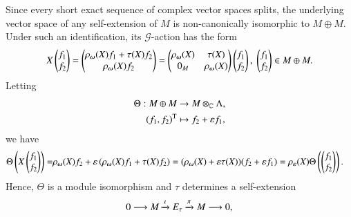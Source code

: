 \documentclass[12pt,reqno]{amsart}
\def\C{\mathbb{C}}
\numberwithin{equation}{section}
\begin{document}
Since every short
exact sequence of complex vector spaces splits, 
the underlying vector space of any self-extension of $M$ is non-canonically isomorphic to $M\oplus M$. Under such an identification, its $\mathcal G$-action has the form
\begin{equation}\label{formula 4.3}
\aligned
X
\begin{pmatrix}
    f_1\\
    f_2
\end{pmatrix}
=\begin{pmatrix}
    \rho_{\boldsymbol{\omega}}(X)f_1+\tau(X)f_2\\
    \rho_{\boldsymbol{\omega}}(X)f_2 
\end{pmatrix}
=\begin{pmatrix}
    \rho_{\boldsymbol{\omega}}(X) & \tau(X) \\
    0_M & \rho_{\boldsymbol{\omega}}(X)
\end{pmatrix}\begin{pmatrix}
    f_1\\
    f_2
\end{pmatrix}, \ 
\begin{pmatrix}
    f_1\\
    f_2
\end{pmatrix}\in M\oplus M.
\endaligned
\end{equation} 
Letting 
\begin{equation*}
\aligned
\Theta: M\oplus M&\to  M\otimes_{\C} \Lambda,\\
(f_1,f_2)^{\operatorname{T}}&\mapsto f_2+\varepsilon f_1,
\endaligned
\end{equation*}
we have
\begin{equation*}
\aligned
\Theta\left( X
\begin{pmatrix}
    f_1\\
    f_2
\end{pmatrix}  \right)=&\rho_{\boldsymbol{\omega}}(X)f_2 +\varepsilon\left(\rho_{\boldsymbol{\omega}}(X)f_1+\tau(X)f_2 \right)
=(\rho_{\boldsymbol{\omega}}(X)+\varepsilon\tau(X))(f_2+\varepsilon f_1)=\rho_{\boldsymbol{\varepsilon}}(X)\Theta\left( 
\begin{pmatrix}
    f_1\\
    f_2
\end{pmatrix}  \right).
\endaligned
\end{equation*}
 Hence, $\Theta$ is a module isomorphism and $\tau$ determines a self-extension
\begin{equation}\label{formula 4.4}
\aligned
0\longrightarrow M\xrightarrow{\iota} E_\tau\xrightarrow{\pi} M\longrightarrow0,
\endaligned
\end{equation}
\end{document}
